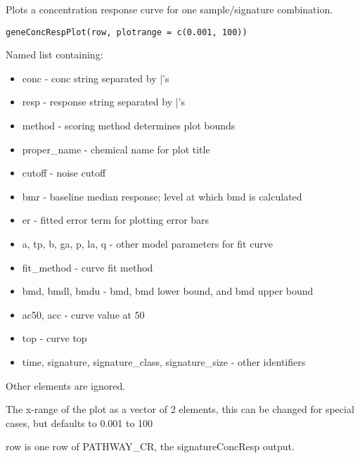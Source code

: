 \documentclass[letterpaper]{book}
\begin{document}
%
\begin{Description}\relax
Plots a concentration response curve for one sample/signature combination.
\end{Description}
%
\begin{Usage}
\begin{verbatim}
geneConcRespPlot(row, plotrange = c(0.001, 100))
\end{verbatim}
\end{Usage}
%
\begin{Arguments}
\begin{ldescription}
\item[\code{row}] Named list containing:
\begin{itemize}

\item conc - conc string separated by |'s
\item resp - response string separated by |'s
\item method - scoring method determines plot bounds
\item proper\_name - chemical name for plot title
\item cutoff - noise cutoff
\item bmr - baseline median response; level at which bmd is calculated
\item er - fitted error term for plotting error bars
\item a, tp, b, ga, p, la, q - other model parameters for fit curve
\item fit\_method - curve fit method
\item bmd, bmdl, bmdu - bmd, bmd lower bound, and bmd upper bound
\item ac50, acc - curve value at 50
\item top - curve top
\item time, signature, signature\_class, signature\_size - other identifiers

\end{itemize}

Other elements are ignored.

\item[\code{plotrange}] The x-range of the plot as a vector of 2 elements, this can be changed for special cases, but defaults to 0.001 to 100
\end{ldescription}
\end{Arguments}
%
\begin{Details}\relax
row is one row of PATHWAY\_CR, the signatureConcResp output.
\end{Details}
\end{document}

